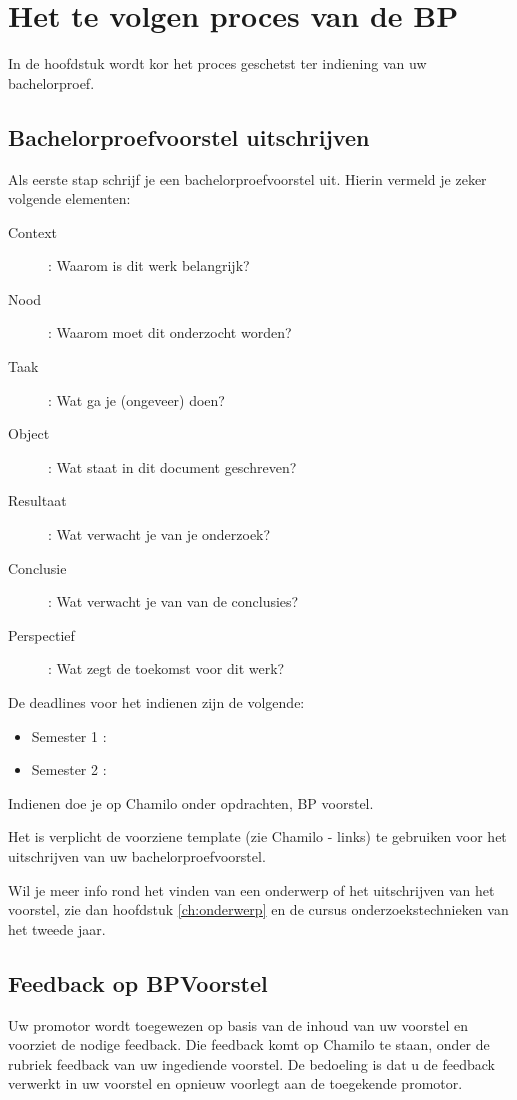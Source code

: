 \chapter{Het te volgen proces van de BP}

In de hoofdstuk wordt kor het proces geschetst ter indiening van uw bachelorproef. 

\section{Bachelorproefvoorstel uitschrijven}
Als eerste stap schrijf je een bachelorproefvoorstel uit. Hierin vermeld je zeker volgende elementen:

\begin{description}
	\item [Context]:  Waarom is dit werk belangrijk?
	\item [Nood] :  Waarom moet dit onderzocht worden?
	\item [Taak]:  Wat ga je (ongeveer) doen?
	\item [Object]: Wat staat in dit document geschreven?
	\item [Resultaat]: Wat verwacht je van je onderzoek?
	\item [Conclusie]: Wat verwacht je van van de conclusies?
	\item [Perspectief]: Wat zegt de toekomst voor dit werk?
\end{description}

De deadlines voor het indienen zijn de volgende:
\begin{framed}
	\begin{itemize}
		\item Semester 1 : \voorstelSemEen{}
		\item Semester 2 : \voorstelSemTwee{}
	\end{itemize}
\end{framed}

Indienen doe je op Chamilo onder opdrachten, BP voorstel.

\begin{framed}
	Het is verplicht de voorziene template (zie Chamilo - links) te gebruiken voor het uitschrijven van uw bachelorproefvoorstel.
\end{framed}

Wil je meer info rond het vinden van een onderwerp of het uitschrijven van het voorstel, zie dan hoofdstuk \ref{ch:onderwerp} en de cursus onderzoekstechnieken van het tweede jaar.

\section{Feedback op BPVoorstel}
Uw promotor wordt toegewezen op basis van de inhoud van uw voorstel en voorziet de nodige feedback. Die feedback komt op Chamilo te staan, onder de rubriek feedback van uw ingediende voorstel. De bedoeling is dat u de feedback verwerkt in uw voorstel en opnieuw voorlegt aan de toegekende promotor.

